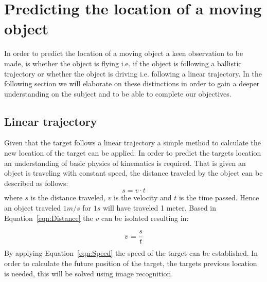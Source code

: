 \section{Predicting the location of a moving object}
In order to predict the location of a moving object a keen observation to be made, is whether the object is flying i.e{.} if the object is following a ballistic trajectory or whether the object is driving i.e{.} following a linear trajectory. 
In the following section we will elaborate on these distinctions in order to gain a deeper understanding on the subject and to be able to complete our objectives. 
\subsection{Linear trajectory}
Given that the target follows a linear trajectory a simple method to calculate the new location of the target can be applied.  
In order to predict the targets location an understanding of basic physics of kinematics is required. 
That is given an object is traveling with constant speed, the distance traveled by the object can be described as follows:
\begin{equation}\label{eqn:Distance}
s = v \cdot t
\end{equation}
where $ s $ is the distance traveled, $ v $ is the velocity and $ t $ is the time passed.
Hence an object traveled $ 1 m/s $ for $ 1 s $ will have traveled 1 meter. 
Based in Equation~\ref{eqn:Distance} the $ v $ can be isolated resulting in:
\begin{equation}\label{eqn:Speed}
v = \cfrac{s}{t}
\end{equation}
By applying Equation~\ref{eqn:Speed} the speed of the target can be established. 
In order to calculate the future position of the target, the targets previous location is needed, this will be solved using image recognition.

%
